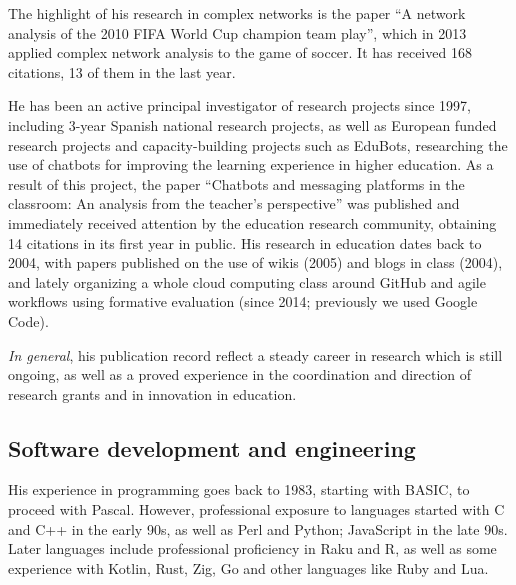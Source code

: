\documentclass[a4paper,12pt]{article}
\begin{document}
The highlight of his research in complex networks is the paper ``A network analysis of the 2010 FIFA World Cup champion team play'', which in 2013 applied complex network analysis to the game of soccer. It has received 168 citations, 13 of them in the last year.

He has been an active principal investigator of research projects since 1997,
including 3-year Spanish national research projects, as well as European funded
research projects and capacity-building projects such as EduBots, researching
the use of chatbots for improving the learning experience in higher
education. As a result of this project, the paper ``Chatbots and messaging
platforms in the classroom: An analysis from the teacher’s perspective'' was
published and immediately received attention by the education research
community, obtaining 14 citations in its first year in public. His research in
education dates back to 2004, with papers published on the use of wikis (2005) and
blogs in class (2004), and lately organizing a whole cloud computing class around
GitHub and agile workflows using formative evaluation (since 2014; previously we
used Google Code).


{\em In general}, his publication record reflect a steady career in research
which is still ongoing, as well as a proved experience in the coordination and
direction of research grants and in innovation in education.

\subsection{Software development and engineering}

His experience in programming goes back to 1983, starting with BASIC, to proceed
with Pascal. However, professional exposure to languages started with C and C++
in the early 90s, as well as Perl and Python; JavaScript in the late 90s. Later
languages include professional proficiency in Raku and R, as well as some
experience with Kotlin, Rust, Zig, Go and other languages like Ruby and Lua.
\end{document}
